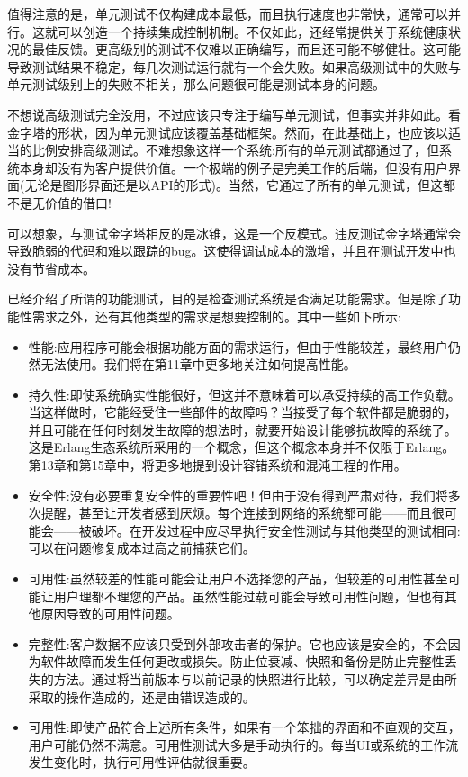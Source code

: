 值得注意的是，单元测试不仅构建成本最低，而且执行速度也非常快，通常可以并行。这就可以创造一个持续集成控制机制。不仅如此，还经常提供关于系统健康状况的最佳反馈。更高级别的测试不仅难以正确编写，而且还可能不够健壮。这可能导致测试结果不稳定，每几次测试运行就有一个会失败。如果高级测试中的失败与单元测试级别上的失败不相关，那么问题很可能是测试本身的问题。

不想说高级测试完全没用，不过应该只专注于编写单元测试，但事实并非如此。看金字塔的形状，因为单元测试应该覆盖基础框架。然而，在此基础上，也应该以适当的比例安排高级测试。不难想象这样一个系统:所有的单元测试都通过了，但系统本身却没有为客户提供价值。一个极端的例子是完美工作的后端，但没有用户界面(无论是图形界面还是以API的形式)。当然，它通过了所有的单元测试，但这都不是无价值的借口!

可以想象，与测试金字塔相反的是冰锥，这是一个反模式。违反测试金字塔通常会导致脆弱的代码和难以跟踪的bug。这使得调试成本的激增，并且在测试开发中也没有节省成本。


已经介绍了所谓的功能测试，目的是检查测试系统是否满足功能需求。但是除了功能性需求之外，还有其他类型的需求是想要控制的。其中一些如下所示:

\begin{itemize}
\item 
性能:应用程序可能会根据功能方面的需求运行，但由于性能较差，最终用户仍然无法使用。我们将在第11章中更多地关注如何提高性能。

\item 
持久性:即使系统确实性能很好，但这并不意味着可以承受持续的高工作负载。当这样做时，它能经受住一些部件的故障吗？当接受了每个软件都是脆弱的，并且可能在任何时刻发生故障的想法时，就要开始设计能够抗故障的系统了。这是Erlang生态系统所采用的一个概念，但这个概念本身并不仅限于Erlang。第13章和第15章中，将更多地提到设计容错系统和混沌工程的作用。

\item 
安全性:没有必要重复安全性的重要性吧！但由于没有得到严肃对待，我们将多次提醒，甚至让开发者感到厌烦。每个连接到网络的系统都可能——而且很可能会——被破坏。在开发过程中应尽早执行安全性测试与其他类型的测试相同:可以在问题修复成本过高之前捕获它们。

\item 
可用性:虽然较差的性能可能会让用户不选择您的产品，但较差的可用性甚至可能让用户理都不理您的产品。虽然性能过载可能会导致可用性问题，但也有其他原因导致的可用性问题。

\item 
完整性:客户数据不应该只受到外部攻击者的保护。它也应该是安全的，不会因为软件故障而发生任何更改或损失。防止位衰减、快照和备份是防止完整性丢失的方法。通过将当前版本与以前记录的快照进行比较，可以确定差异是由所采取的操作造成的，还是由错误造成的。

\item 
可用性:即使产品符合上述所有条件，如果有一个笨拙的界面和不直观的交互，用户可能仍然不满意。可用性测试大多是手动执行的。每当UI或系统的工作流发生变化时，执行可用性评估就很重要。
\end{itemize}

